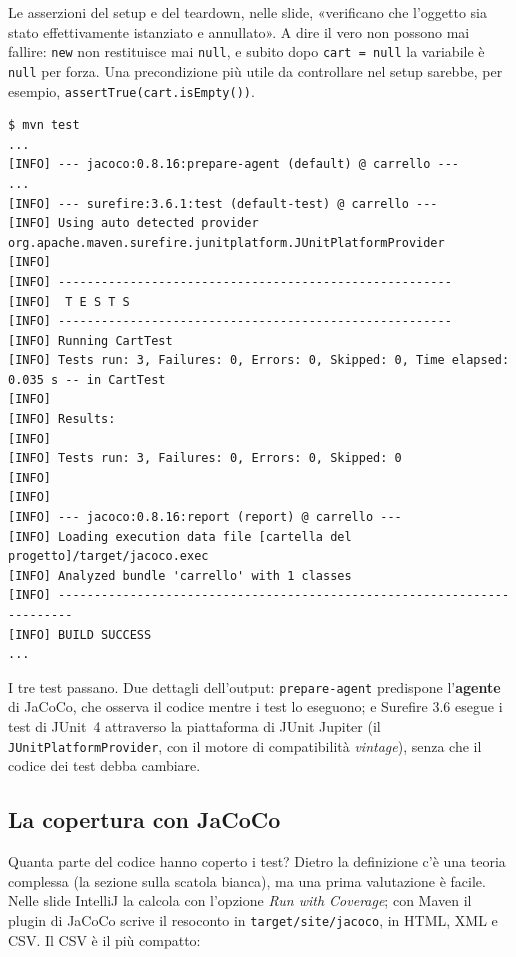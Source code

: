 Le asserzioni del setup e del teardown, nelle slide, «verificano che l'oggetto sia stato effettivamente istanziato e
annullato». A dire il vero non possono mai fallire: \texttt{new} non restituisce mai \texttt{null}, e subito dopo
\texttt{cart = null} la variabile è \texttt{null} per forza. Una precondizione più utile da controllare nel setup
sarebbe, per esempio, \texttt{assertTrue(cart.isEmpty())}.

\begin{lstlisting}[style=shell, name=Terminale]
$ mvn test
...
[INFO] --- jacoco:0.8.16:prepare-agent (default) @ carrello ---
...
[INFO] --- surefire:3.6.1:test (default-test) @ carrello ---
[INFO] Using auto detected provider org.apache.maven.surefire.junitplatform.JUnitPlatformProvider
[INFO]
[INFO] -------------------------------------------------------
[INFO]  T E S T S
[INFO] -------------------------------------------------------
[INFO] Running CartTest
[INFO] Tests run: 3, Failures: 0, Errors: 0, Skipped: 0, Time elapsed: 0.035 s -- in CartTest
[INFO]
[INFO] Results:
[INFO]
[INFO] Tests run: 3, Failures: 0, Errors: 0, Skipped: 0
[INFO]
[INFO]
[INFO] --- jacoco:0.8.16:report (report) @ carrello ---
[INFO] Loading execution data file [cartella del progetto]/target/jacoco.exec
[INFO] Analyzed bundle 'carrello' with 1 classes
[INFO] ------------------------------------------------------------------------
[INFO] BUILD SUCCESS
...
\end{lstlisting}

I tre test passano. Due dettagli dell'output: \texttt{prepare-agent} predispone l'\textbf{agente} di JaCoCo, che
osserva il codice mentre i test lo eseguono; e Surefire 3.6 esegue i test di JUnit~4 attraverso la piattaforma di
JUnit Jupiter (il \texttt{JUnitPlatformProvider}, con il motore di compatibilità \textit{vintage}), senza che il codice
dei test debba cambiare.

\subsection{La copertura con JaCoCo}

Quanta parte del codice hanno coperto i test? Dietro la definizione c'è una teoria complessa (la sezione sulla scatola
bianca), ma una prima valutazione è facile. Nelle slide IntelliJ la calcola con l'opzione \textit{Run with Coverage};
con Maven il plugin di JaCoCo scrive il resoconto in \texttt{target/site/jacoco}, in HTML, XML e CSV. Il CSV è il più
compatto:

